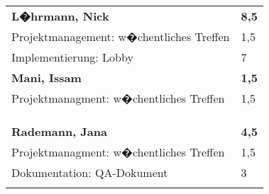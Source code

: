 \documentclass[a4paper,11pt]{scrartcl}
\begin{document}
\begin{longtable}{| p{13.8cm} | C{2.4cm} |}

	&

	\\
	\hline
	\hline


	\textbf{L�hrmann, Nick} & \textbf{8,5}\\ %
	\hline

	Projektmanagement: w�chentliches Treffen
	&
	1,5
	\\
	\hline

	Implementierung: Lobby
	&
  7
	\\
	\hline
	\hline


	\textbf{Mani, Issam} & \textbf{1,5}\\ %
	\hline

  Projektmanagment: w�chentliches Treffen
	&
  1,5
	\\
	\hline


	&

	\\
	\hline


	&

	\\
	\hline


	&

	\\
	\hline
	\hline


	\textbf{Rademann, Jana} & \textbf{4,5}\\ %
	\hline

  Projektmanagment: w�chentliches Treffen
	&
  1,5
	\\
	\hline

  Dokumentation: QA-Dokument
	&
  3
	\\
	\hline


	&

	\\
	\hline


\end{longtable}
\end{document}
